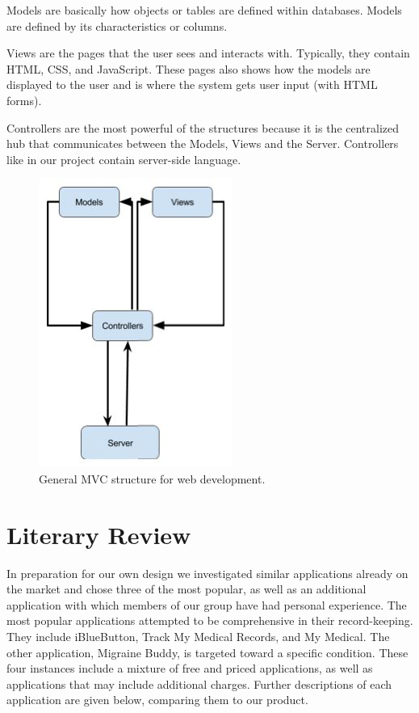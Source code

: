 \documentclass[twocolumn,12pt]{article}
\begin{document}
Models are basically how objects or tables are defined within databases.  Models are defined by its characteristics or columns.

Views are the pages that the user sees and interacts with.  Typically, they contain HTML, CSS, and JavaScript.  These pages also shows how the models are displayed to the user and is where the system gets user input (with HTML forms).

Controllers are the most powerful of the structures because it is the centralized hub that communicates between the Models, Views and the Server.  Controllers like in our project contain server-side language.

\begin{figure}[!htb] 
	\centering
	\includegraphics[scale=1]{./490/MVC3.jpg}
	\caption{General MVC structure for web development.}
\end{figure} 

\section{Literary Review}
In preparation for our own design we investigated similar applications already on the market and chose three of the most popular, as well as an additional application with which members of our group have had personal experience. The most popular applications attempted to be comprehensive in their record-keeping. They include iBlueButton, Track My Medical Records, and My Medical. The other application, Migraine Buddy, is targeted toward a specific condition. These four instances include a mixture of free and priced applications, as well as applications that may include additional charges. Further descriptions of each application are given below, comparing them to our product.
\end{document}
